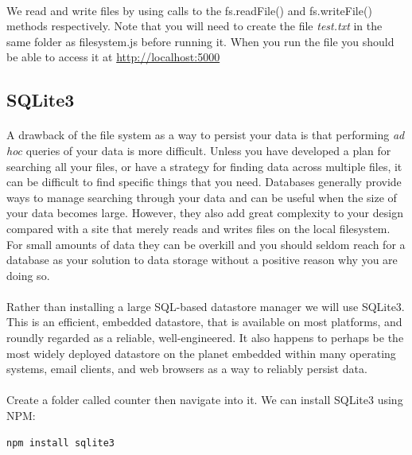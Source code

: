\documentclass[10pt, a4paper, twosize]{article}
\begin{document}
\paragraph{} We read and write files by using calls to the fs.readFile() and fs.writeFile() methods respectively. Note that you will need to create the file \emph{test.txt} in the same folder as filesystem.js before running it. When you run the file you should be able to access it at \url{http://localhost:5000}

\subsection{SQLite3}
\paragraph{} A drawback of the file system as a way to persist your data is that performing \emph{ad hoc} queries of your data is more difficult. Unless you have developed a plan for searching all your files, or have a strategy for finding data across multiple files, it can be difficult to find specific things that you need. Databases generally provide ways to manage searching through your data and can be useful when the size of your data becomes large. However, they also add great complexity to your design compared with a site that merely reads and writes files on the local filesystem. For small amounts of data they can be overkill and you should seldom reach for a database as your solution to data storage without a positive reason why you are doing so.

\paragraph{} Rather than installing a large SQL-based datastore manager we will use SQLite3. This is an efficient, embedded datastore, that is available on most platforms, and roundly regarded as a reliable, well-engineered. It also happens to perhaps be the most widely deployed datastore on the planet embedded within many operating systems, email clients, and web browsers as a way to reliably persist data.

\paragraph{} Create a folder called counter then navigate into it. We can install SQLite3 using NPM:

\begin{lstlisting}[style=DOS]
    npm install sqlite3
\end{lstlisting}
\end{document}
